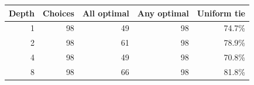 \begin{tabular}{rrrrr}\toprule
Depth & Choices & All optimal & Any optimal & Uniform tie\\\midrule
1 & 98 & 49 & 98 & 74.7\%\\
2 & 98 & 61 & 98 & 78.9\%\\
4 & 98 & 49 & 98 & 70.8\%\\
8 & 98 & 66 & 98 & 81.8\%\\
\bottomrule\end{tabular}
